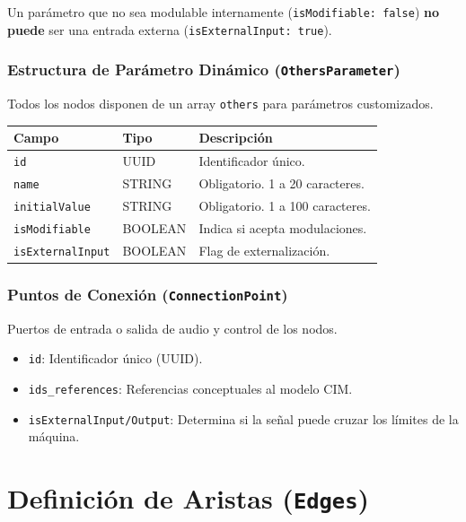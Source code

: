 \begin{tcolorbox}[colback=red!5!white,colframe=red!75!black,title=Regla de Integridad Semántica]
Un parámetro que no sea modulable internamente (\texttt{isModifiable: false}) \textbf{no puede} ser una entrada externa (\texttt{isExternalInput: true}).
\end{tcolorbox}

\subsubsection{Estructura de Parámetro Dinámico (\texttt{OthersParameter})}

Todos los nodos disponen de un array \texttt{others} para parámetros customizados.

\begin{table}[H]
\centering
\small
\begin{tabular}{@{}lll@{}}
\toprule
Campo & Tipo & Descripción \\ \midrule
\texttt{id} & UUID & Identificador único. \\
\texttt{name} & STRING & Obligatorio. 1 a 20 caracteres. \\
\texttt{initialValue} & STRING & Obligatorio. 1 a 100 caracteres. \\
\texttt{isModifiable} & BOOLEAN & Indica si acepta modulaciones. \\
\texttt{isExternalInput} & BOOLEAN & Flag de externalización. \\ \bottomrule
\end{tabular}
\end{table}

\subsubsection{Puntos de Conexión (\texttt{ConnectionPoint})}

Puertos de entrada o salida de audio y control de los nodos.

\begin{itemize}
    \item \texttt{id}: Identificador único (UUID).
    \item \texttt{ids\_references}: Referencias conceptuales al modelo CIM.
    \item \texttt{isExternalInput/Output}: Determina si la señal puede cruzar los límites de la máquina.
\end{itemize}

\section{Definición de Aristas (\texttt{Edges})}

